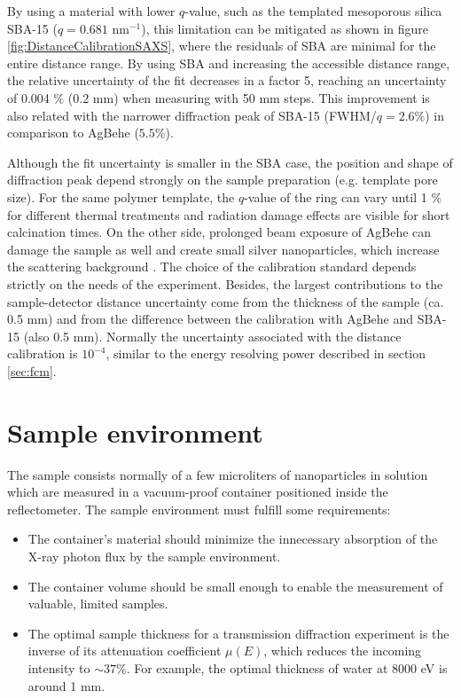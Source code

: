 By using a material with lower $q$-value, such as the templated mesoporous silica SBA-15 \citep{zhao_triblock_1998} ($q=0.681$ nm$^{-1}$), this limitation can be mitigated as shown in figure \ref{fig:DistanceCalibrationSAXS}, where the residuals of SBA are minimal for the entire distance range. By using SBA and increasing the accessible distance range, the relative uncertainty of the fit decreases in a factor 5, reaching an uncertainty of 0.004 $\%$ (0.2 mm) when measuring with 50 mm steps. This improvement is also related with the narrower diffraction peak of SBA-15 (FWHM/$q=2.6\%$) in comparison to AgBehe ($5.5\%$).

Although the fit uncertainty is smaller in the SBA case, the position and shape of diffraction peak depend strongly on the sample preparation (e.g. template pore size). For the same polymer template, the $q$-value of the ring can vary until 1 $\%$ for different thermal treatments and radiation damage effects are visible for short calcination times. On the other side, prolonged beam exposure of AgBehe can damage the sample as well and create small silver nanoparticles, which increase the scattering background \cite{liu_thermal_2006}. The choice of the calibration standard depends strictly on the needs of the experiment. Besides, the largest contributions to the sample-detector distance uncertainty come from the thickness of the sample (ca. 0.5 mm) and from the difference between the calibration with AgBehe and SBA-15 (also 0.5 mm). Normally the uncertainty associated with the distance calibration is $10^{-4}$, similar to the energy resolving power described in section \ref{sec:fcm}.

\section{Sample environment}

The sample consists normally of a few microliters of nanoparticles in solution which are measured in a vacuum-proof container positioned inside the reflectometer. The sample environment must fulfill some requirements:

\begin{itemize}
        \item The container's material should minimize the innecessary absorption of the X-ray photon flux by the sample environment.
        \item The container volume should be small enough to enable the measurement of valuable, limited samples.
        \item The optimal sample thickness for a transmission diffraction experiment is the inverse of its attenuation coefficient $\mu(E)$, which reduces the incoming intensity to $\sim37\%$. For example, the optimal thickness of water at 8000 eV is around 1 mm.
\end{itemize}

